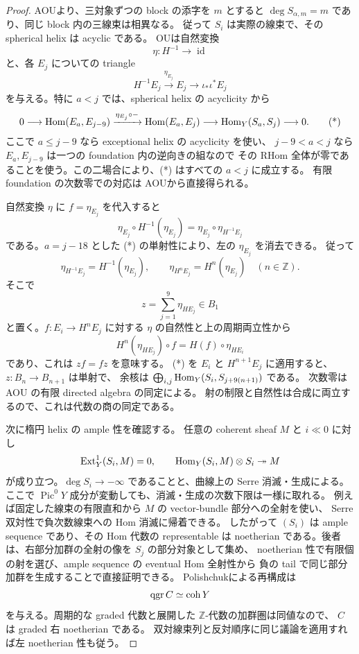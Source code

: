 \begin{proof}
AOU\cite[Lemma 7.4]{AOU}より、三対象ずつの block の添字を $m$ とすると
$\deg S_{\alpha,m}=m$ であり、同じ block 内の三線束は相異なる。
従って $S_i$ は実際の線束で、その spherical helix は acyclic である。
OU\cite[(30)--(32)]{OUHelix}は自然変換
\[
 \eta:H^{-1}\longrightarrow\operatorname{id}
\]
と、各 $E_j$ についての triangle
\[
 H^{-1}E_j\xrightarrow{\eta_{E_j}}E_j
 \longrightarrow\iota_*\iota^*E_j
\]
を与える。特に $a<j$ では、spherical helix の acyclicity から
\[
 0\longrightarrow\operatorname{Hom}(E_a,E_{j-9})
 \xrightarrow{\eta_{E_j}\circ-}\operatorname{Hom}(E_a,E_j)
 \longrightarrow\operatorname{Hom}_Y(S_a,S_j)\longrightarrow0.
 \tag{*}
\]
ここで $a\le j-9$ なら exceptional helix の acyclicity を使い、
$j-9<a<j$ なら $E_a,E_{j-9}$ は一つの foundation 内の逆向きの組なので
その RHom 全体が零であることを使う。この二場合により、(*) はすべての $a<j$ に成立する。
有限 foundation の次数零での対応は
AOU\cite[(7.1)]{AOU}から直接得られる。

自然変換 $\eta$ に $f=\eta_{E_j}$ を代入すると
\[
 \eta_{E_j}\circ H^{-1}(\eta_{E_j})
 =\eta_{E_j}\circ\eta_{H^{-1}E_j}
\]
である。$a=j-18$ とした (*) の単射性により、左の $\eta_{E_j}$ を消去できる。
従って
\[
 \eta_{H^{-1}E_j}=H^{-1}(\eta_{E_j}),
 \qquad
 \eta_{H^nE_j}=H^n(\eta_{E_j})\quad(n\in\mathbb Z).
\]
そこで
\[
 z=\sum_{j=1}^{9}\eta_{HE_j}\in B_1
\]
と置く。$f:E_i\to H^nE_j$ に対する $\eta$ の自然性と上の周期両立性から
\[
 H^n(\eta_{HE_j})\circ f=H(f)\circ\eta_{HE_i}
\]
であり、これは $zf=fz$ を意味する。
(*) を $E_i$ と $H^{n+1}E_j$ に適用すると、$z:B_n\to B_{n+1}$ は単射で、
余核は $\bigoplus_{i,j}\operatorname{Hom}_Y(S_i,S_{j+9(n+1)})$ である。
次数零は AOU の有限 directed algebra の同定による。
射の制限と自然性は合成に両立するので、これは代数の商の同定である。

次に楕円 helix の ample 性を確認する。
任意の coherent sheaf $M$ と $i\ll0$ に対し
\[
 \operatorname{Ext}^1_Y(S_i,M)=0,
 \qquad
 \operatorname{Hom}_Y(S_i,M)\otimes S_i\twoheadrightarrow M
\]
が成り立つ。$\deg S_i\to-\infty$ であることと、曲線上の Serre 消滅・生成による。
ここで $\operatorname{Pic}^0Y$ 成分が変動しても、消滅・生成の次数下限は一様に取れる。
例えば固定した線束の有限直和から $M$ の vector-bundle 部分への全射を使い、
Serre 双対性で負次数線束への Hom 消滅に帰着できる。
したがって $(S_i)$ は ample sequence であり、その Hom 代数の representable は
noetherian である。後者は、右部分加群の全射の像を $S_j$ の部分対象として集め、
noetherian 性で有限個の射を選び、ample sequence の eventual Hom 全射性から
負の tail で同じ部分加群を生成することで直接証明できる。
Polishchuk\cite[Theorem 2.4]{PolishchukProj}による再構成は
\[
 \operatorname{qgr} C\simeq\operatorname{coh}Y
\]
を与える。周期的な graded 代数と展開した $\mathbb Z$-代数の加群圏は同値なので、
$C$ は graded 右 noetherian である。
双対線束列と反対順序に同じ議論を適用すれば左 noetherian 性も従う。


\end{proof}
